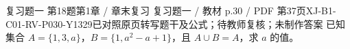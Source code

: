 \par\noindent\begin{minipage}{\linewidth}
\begin{bankitem}{复习题一 第18题}{第1章 / 章末复习 复习题一 / 教材 p.30 / PDF 第37页}{XJ-B1-C01-RV-P030-Y1329}{已对照原页转写题干及公式；待教师复核；未制作答案}
已知集合 $A=\{1,3,a\}$，$B=\{1,a^2-a+1\}$，且 $A\cup B=A$，求 $a$ 的值。
\end{bankitem}
\end{minipage}\par\medskip

